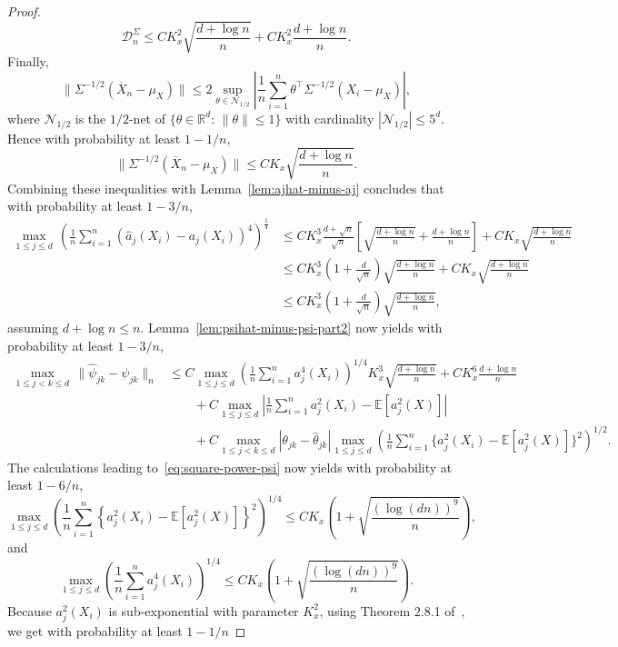 \documentclass[11pt]{article}
\begin{document}
\begin{appendices}
\begin{proof}
\[
\mathcal{D}_n^{\Sigma} \le CK_x^2\sqrt{\frac{d + \log n}{n}} + CK_x^2\frac{d + \log n}{n}.
\]
Finally,
\[
\|\Sigma^{-1/2}(\overline{X}_n - \mu_X)\| \le 2\sup_{\theta\in\mathcal{N}_{1/2}}\left|\frac{1}{n}\sum_{i=1}^n \theta^{\top}\Sigma^{-1/2}(X_i - \mu_X)\right|,
\]
where $\mathcal{N}_{1/2}$ is the $1/2$-net of $\{\theta\in\mathbb{R}^d:\,\|\theta\| \le 1\}$ with cardinality $|\mathcal{N}_{1/2}| \le 5^d$. Hence with probability at least $1 - 1/n$,
\[
\|\Sigma^{-1/2}(\overline{X}_n - \mu_X)\| \le CK_x\sqrt{\frac{d + \log n}{n}}.
\]
Combining these inequalities with Lemma~\ref{lem:ajhat-minus-aj} concludes that with probability at least $1 - 3/n$,
\begin{align*}
\max_{1\le j\le d}\,\left(\frac{1}{n}\sum_{i=1}^n (\widehat{a}_j(X_i) - a_j(X_i))^4\right)^{\frac{1}{4}} &\le CK_x^3\frac{d + \sqrt{n}}{\sqrt{n}}\left[\sqrt{\frac{d + \log n}{n}} + \frac{d + \log n}{n}\right] + CK_x\sqrt{\frac{d + \log n}{n}}\\
&\le CK_x^3\left(1 + \frac{d}{\sqrt{n}}\right)\sqrt{\frac{d + \log n}{n}} + CK_x\sqrt{\frac{d + \log n}{n}}\\
&\le CK_x^3\left(1 + \frac{d}{\sqrt{n}}\right)\sqrt{\frac{d + \log n}{n}},
\end{align*}
assuming  $d + \log n \le n$. Lemma~\ref{lem:psihat-minus-psi-part2} now yields with probability at least $1 - 3/n$,
\begin{align}
\max_{1\le j < k\le d}\,\|\widehat{\psi}_{jk} - \psi_{jk}\|_n &\le C\max_{1\le j\le d}\left(\frac{1}{n}\sum_{i=1}^n a_j^4(X_i)\right)^{1/4}K_x^3\sqrt{\frac{d + \log n}{n}} + CK_x^6\frac{d + \log n}{n}\nonumber\\
&\qquad+ C\max_{1\le j\le d}\left|\frac{1}{n}\sum_{i=1}^n a_j^2(X_i) - \mathbb{E}[a_j^2(X)]\right|\label{eq:first-part-psihat-minus-psi}\\
&\qquad+ C\max_{1\le j < k\le d}|\theta_{jk} - \widehat{\theta}_{jk}|\max_{1\le j\le d}\left(\frac{1}{n}\sum_{i=1}^n \{a_j^2(X_i) - \mathbb{E}[a_j^2(X)]\}^2\right)^{1/2}.\nonumber
\end{align}
The calculations leading to~\eqref{eq:square-power-psi} now yields with probability at least $1 - 6/n$,
\[
\max_{1\le j\le d}\left(\frac{1}{n}\sum_{i=1}^n \left\{a_j^2(X_i) - \mathbb{E}[a_j^2(X)]\right\}^2\right)^{1/4} \le CK_x\left(1 + \sqrt{\frac{(\log(dn))^9}{n}}\right),
\]
and
\[
\max_{1\le j\le d}\left(\frac{1}{n}\sum_{i=1}^n a_j^4(X_i)\right)^{1/4} \le CK_x\left(1 + \sqrt{\frac{(\log(dn))^9}{n}}\right).
\]
Because $a_j^2(X_i)$ is sub-exponential with parameter $K_x^2$, using Theorem 2.8.1 of~\cite{Vershynin18}, we get with probability at least $1 - 1/n$

\end{proof}
\end{appendices}
\end{document}
